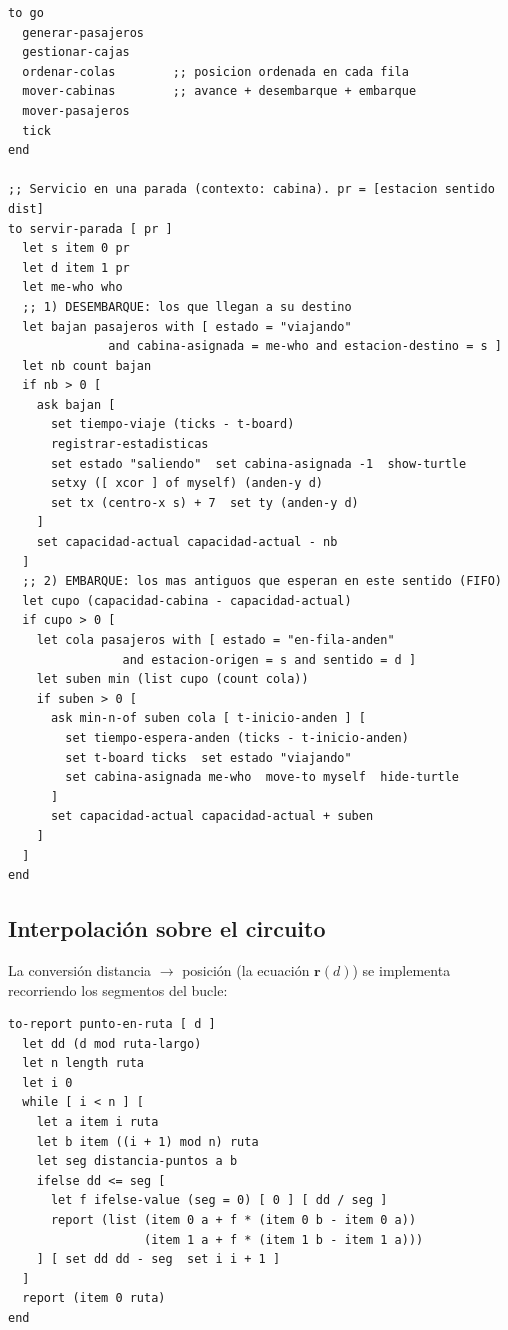 \documentclass[11pt,a4paper]{article}
\begin{document}
\begin{lstlisting}
to go
  generar-pasajeros
  gestionar-cajas
  ordenar-colas        ;; posicion ordenada en cada fila
  mover-cabinas        ;; avance + desembarque + embarque
  mover-pasajeros
  tick
end

;; Servicio en una parada (contexto: cabina). pr = [estacion sentido dist]
to servir-parada [ pr ]
  let s item 0 pr
  let d item 1 pr
  let me-who who
  ;; 1) DESEMBARQUE: los que llegan a su destino
  let bajan pasajeros with [ estado = "viajando"
              and cabina-asignada = me-who and estacion-destino = s ]
  let nb count bajan
  if nb > 0 [
    ask bajan [
      set tiempo-viaje (ticks - t-board)
      registrar-estadisticas
      set estado "saliendo"  set cabina-asignada -1  show-turtle
      setxy ([ xcor ] of myself) (anden-y d)
      set tx (centro-x s) + 7  set ty (anden-y d)
    ]
    set capacidad-actual capacidad-actual - nb
  ]
  ;; 2) EMBARQUE: los mas antiguos que esperan en este sentido (FIFO)
  let cupo (capacidad-cabina - capacidad-actual)
  if cupo > 0 [
    let cola pasajeros with [ estado = "en-fila-anden"
                and estacion-origen = s and sentido = d ]
    let suben min (list cupo (count cola))
    if suben > 0 [
      ask min-n-of suben cola [ t-inicio-anden ] [
        set tiempo-espera-anden (ticks - t-inicio-anden)
        set t-board ticks  set estado "viajando"
        set cabina-asignada me-who  move-to myself  hide-turtle
      ]
      set capacidad-actual capacidad-actual + suben
    ]
  ]
end
\end{lstlisting}

\subsection{Interpolación sobre el circuito}
La conversión distancia $\to$ posición (la ecuación $\mathbf{r}(d)$) se implementa
recorriendo los segmentos del bucle:

\begin{lstlisting}
to-report punto-en-ruta [ d ]
  let dd (d mod ruta-largo)
  let n length ruta
  let i 0
  while [ i < n ] [
    let a item i ruta
    let b item ((i + 1) mod n) ruta
    let seg distancia-puntos a b
    ifelse dd <= seg [
      let f ifelse-value (seg = 0) [ 0 ] [ dd / seg ]
      report (list (item 0 a + f * (item 0 b - item 0 a))
                   (item 1 a + f * (item 1 b - item 1 a)))
    ] [ set dd dd - seg  set i i + 1 ]
  ]
  report (item 0 ruta)
end
\end{lstlisting}
\end{document}
